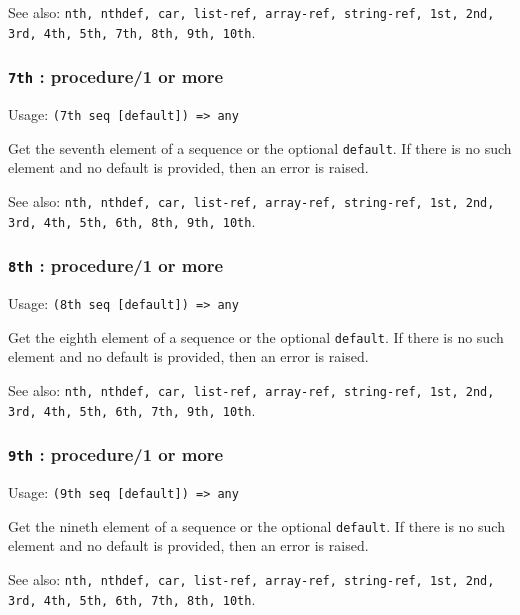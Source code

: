 \documentclass[
]{article}
\newcommand{\passthrough}[1]{#1}
\begin{document}
See also:
\passthrough{\lstinline!nth, nthdef, car, list-ref, array-ref, string-ref, 1st, 2nd, 3rd, 4th, 5th, 7th, 8th, 9th, 10th!}.

\hypertarget{th-procedure1-or-more-4}{%
\subsubsection{\texorpdfstring{\texttt{7th} : procedure/1 or
more}{7th : procedure/1 or more}}\label{th-procedure1-or-more-4}}

Usage: \passthrough{\lstinline!(7th seq [default]) => any!}

Get the seventh element of a sequence or the optional
\passthrough{\lstinline!default!}. If there is no such element and no
default is provided, then an error is raised.

See also:
\passthrough{\lstinline!nth, nthdef, car, list-ref, array-ref, string-ref, 1st, 2nd, 3rd, 4th, 5th, 6th, 8th, 9th, 10th!}.

\hypertarget{th-procedure1-or-more-5}{%
\subsubsection{\texorpdfstring{\texttt{8th} : procedure/1 or
more}{8th : procedure/1 or more}}\label{th-procedure1-or-more-5}}

Usage: \passthrough{\lstinline!(8th seq [default]) => any!}

Get the eighth element of a sequence or the optional
\passthrough{\lstinline!default!}. If there is no such element and no
default is provided, then an error is raised.

See also:
\passthrough{\lstinline!nth, nthdef, car, list-ref, array-ref, string-ref, 1st, 2nd, 3rd, 4th, 5th, 6th, 7th, 9th, 10th!}.

\hypertarget{th-procedure1-or-more-6}{%
\subsubsection{\texorpdfstring{\texttt{9th} : procedure/1 or
more}{9th : procedure/1 or more}}\label{th-procedure1-or-more-6}}

Usage: \passthrough{\lstinline!(9th seq [default]) => any!}

Get the nineth element of a sequence or the optional
\passthrough{\lstinline!default!}. If there is no such element and no
default is provided, then an error is raised.

See also:
\passthrough{\lstinline!nth, nthdef, car, list-ref, array-ref, string-ref, 1st, 2nd, 3rd, 4th, 5th, 6th, 7th, 8th, 10th!}.
\end{document}
